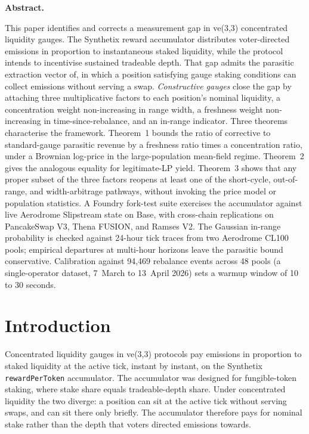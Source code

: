 \documentclass[11pt,a4paper]{article}
\renewenvironment{abstract}{%
  \fontsize{10pt}{13pt}\selectfont
  \begin{list}{}{%
    \setlength{\leftmargin}{0.5in}%
    \setlength{\rightmargin}{0.5in}%
    \setlength{\listparindent}{0pt}%
    \setlength{\parsep}{6pt plus 2pt minus 1pt}%
    \setlength{\topsep}{0pt}%
    \setlength{\partopsep}{0pt}%
  }\item[]\noindent\textbf{Abstract.}\hspace{0.5em}\ignorespaces
}{\end{list}}
\theoremstyle{definition}
\theoremstyle{plain}
\theoremstyle{remark}
\begin{document}
\begin{abstract}
This paper identifies and corrects a measurement gap in ve(3,3) concentrated liquidity gauges. The Synthetix reward accumulator distributes voter-directed emissions in proportion to instantaneous staked liquidity, while the protocol intends to incentivise sustained tradeable depth. That gap admits the parasitic extraction vector of\cite{ryan2026c}, in which a position satisfying gauge staking conditions can collect emissions without serving a swap. \emph{Constructive gauges} close the gap by attaching three multiplicative factors to each position's nominal liquidity, a concentration weight non-increasing in range width, a freshness weight non-increasing in time-since-rebalance, and an in-range indicator. Three theorems characterise the framework. Theorem~1 bounds the ratio of corrective to standard-gauge parasitic revenue by a freshness ratio times a concentration ratio, under a Brownian log-price in the large-population mean-field regime. Theorem~2 gives the analogous equality for legitimate-LP yield. Theorem~3 shows that any proper subset of the three factors reopens at least one of the short-cycle, out-of-range, and width-arbitrage pathways, without invoking the price model or population statistics. A Foundry fork-test suite exercises the accumulator against live Aerodrome Slipstream state on Base, with cross-chain replications on PancakeSwap V3, Thena FUSION, and Ramses V2. The Gaussian in-range probability is checked against 24-hour tick traces from two Aerodrome CL100 pools; empirical departures at multi-hour horizons leave the parasitic bound conservative. Calibration against 94{,}469 rebalance events across 48 pools (a single-operator dataset, 7~March to 13~April 2026) sets a warmup window of 10 to 30 seconds.
\end{abstract}

\section{Introduction}\label{sec:intro}

Concentrated liquidity gauges in ve(3,3) protocols pay emissions in proportion to staked liquidity at the active tick, instant by instant, on the Synthetix \texttt{rewardPerToken} accumulator\cite{synthetix2019,egorov2019}. The accumulator was designed for fungible-token staking, where stake share equals tradeable-depth share. Under concentrated liquidity\cite{adams2021} the two diverge: a position can sit at the active tick without serving swaps, and can sit there only briefly. The accumulator therefore pays for nominal stake rather than the depth that voters directed emissions towards.
\end{document}
